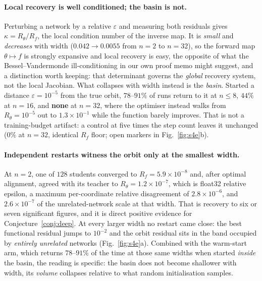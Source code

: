 

\paragraph{Local recovery is well conditioned; the basin is not.} Perturbing a network by a
relative $\varepsilon$ and measuring both residuals gives $\kappa = R_\theta/R_f$, the local
condition number of the inverse map. It is \emph{small} and \emph{decreases} with width
($0.042 \to 0.0055$ from $n=2$ to $n=32$), so the forward map $\theta\mapsto f$ is strongly
expansive and local recovery is easy, the opposite of what the Bessel--Vandermonde
ill-conditioning in our own proof memo might suggest, and a distinction worth keeping: that
determinant governs the \emph{global} recovery system, not the local Jacobian. What collapses with
width instead is the \emph{basin}. Started a distance $\varepsilon=10^{-5}$ from the true orbit,
$78$--$91\%$ of runs return to it at $n\le8$, $44\%$ at $n=16$, and \textbf{none} at $n=32$, where
the optimiser instead walks from $R_\theta = 10^{-5}$ out to $1.3\times10^{-1}$ while the function
barely improves. That is not a training-budget artifact: a control at five times the step count
leaves it unchanged ($0\%$ at $n=32$, identical $R_f$ floor; open markers in
Fig.~\ref{fig:s4e}b).

\paragraph{Independent restarts witness the orbit only at the smallest width.} At $n=2$, one of
$128$ students converged to $R_f = 5.9\times10^{-8}$ and, after optimal alignment, agreed with its
teacher to $R_\theta = 1.2\times10^{-7}$, which is float32 relative epsilon, a maximum per-coordinate
relative disagreement of $2.8\times10^{-6}$, and $2.6\times10^{-7}$ of the unrelated-network scale
at that width. That is recovery to six or seven significant figures, and it is direct positive
evidence for Conjecture~\ref{conj:deep}. At every larger width no restart came close: the best
functional residual jumps to $10^{-2}$ and the orbit residual sits in the band occupied by
\emph{entirely unrelated} networks (Fig.~\ref{fig:s4e}a). Combined with the warm-start arm, which
returns $78$--$91\%$ of the time at those same widths when started \emph{inside} the basin, the
reading is specific: the basin does not become shallower with width, its \emph{volume} collapses
relative to what random initialisation samples.

